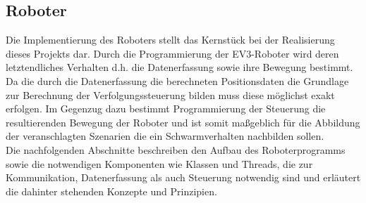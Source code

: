 \subsection{Roboter}
Die Implementierung des Roboters stellt das Kernstück bei der Realisierung dieses Projekts dar. Durch die Programmierung der
EV3-Roboter wird deren letztendliches Verhalten d.h. die Datenerfassung sowie ihre Bewegung bestimmt. Da die durch die Datenerfassung 
die berechneten Positionsdaten die Grundlage zur Berechnung der Verfolgungssteuerung bilden muss diese möglichst exakt erfolgen.
Im Gegenzug dazu bestimmt Programmierung der Steuerung die resultierenden Bewegung der Roboter und ist somit maßgeblich für die 
Abbildung der veranschlagten Szenarien die ein Schwarmverhalten nachbilden sollen. \\
Die nachfolgenden Abschnitte beschreiben den Aufbau des Roboterprogramms sowie die notwendigen Komponenten wie Klassen und 
Threads, die zur Kommunikation, Datenerfassung als auch Steuerung notwendig sind und erläutert die dahinter stehenden Konzepte 
und Prinzipien.
